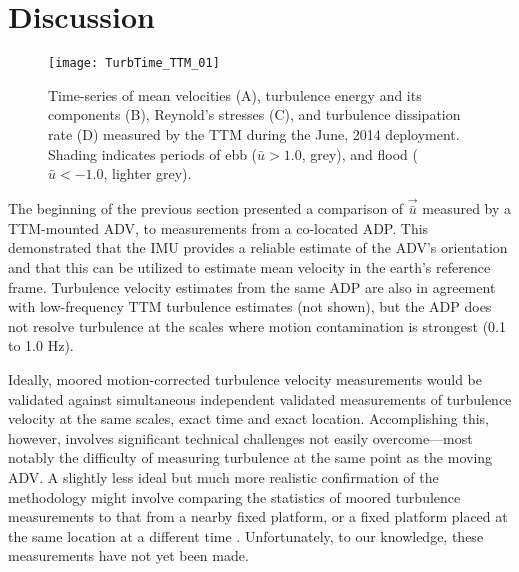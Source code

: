 
\section{Discussion}
\label{sec:discussion}

\begin{figure*}[t]
  \centering
  \texttt{[image: TurbTime\_TTM\_01]}
  \caption{Time-series of mean velocities (A), turbulence energy and its components (B), Reynold's stresses (C), and turbulence dissipation rate (D) measured by the TTM during the June, 2014 deployment. Shading indicates periods of ebb ($\bar{u}>1.0$, grey), and flood ($\bar{u}<-1.0$, lighter grey).}
  \label{fig:turbtime:ttm}
\end{figure*}

The beginning of the previous section presented a comparison of $\vec{\bar{u}}$ measured by a TTM-mounted ADV, to measurements from a co-located ADP. This demonstrated that the IMU provides a reliable estimate of the ADV's orientation and that this can be utilized to estimate mean velocity in the earth's reference frame. Turbulence velocity estimates from the same ADP are also in agreement with low-frequency TTM turbulence estimates (not shown), but the ADP does not resolve turbulence at the scales where motion contamination is strongest (0.1 to 1.0 Hz).

Ideally, moored motion-corrected turbulence velocity measurements would be validated against simultaneous independent validated measurements of turbulence velocity at the same scales, exact time and exact location. Accomplishing this, however, involves significant technical challenges not easily overcome---most notably the difficulty of measuring turbulence at the same point as the moving ADV. A slightly less ideal but much more realistic confirmation of the methodology might involve comparing the statistics of moored turbulence measurements to that from a nearby fixed platform, or a fixed platform placed at the same location at a different time \citep[e.g. the `TTT' platform described in][]{Thomson++2012}. Unfortunately, to our knowledge, these measurements have not yet been made.

